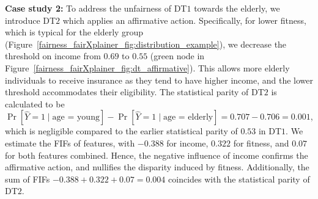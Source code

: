 \begin{example}
	
	
	\textbf{Case study 2:} 	
	To address the unfairness of DT$ 1 $ towards the elderly, we introduce DT$ 2 $ which applies an affirmative action. Specifically, for lower fitness, which is typical for the elderly group (Figure~\ref{fairness_fairXplainer_fig:distribution_example}), we decrease the threshold on income from $ 0.69 $ to $ 0.55 $ ({\color{affirmative}green} node in Figure~\ref{fairness_fairXplainer_fig:dt_affirmative}). This allows more elderly individuals to receive insurance as they tend to have higher income, and the lower threshold accommodates their eligibility. The statistical parity of DT$ 2 $ is calculated to be $ \Pr[\widehat{Y} = 1 \mid \text{age = young}] - \Pr[\widehat{Y} = 1 \mid \text{age = elderly}] = 0.707 - 0.706 = 0.001 $, which is negligible compared to the earlier statistical parity of $ 0.53 $ in DT$ 1 $. We estimate the FIFs of features, with $ - 0.388 $ for income, $ 0.322 $ for fitness, and $ 0.07 $ for both features combined. Hence, the negative influence of income confirms the affirmative action, and nullifies the disparity induced by fitness. Additionally, the sum of FIFs $ - 0.388 + 0.322 + 0.07 = 0.004 $ coincides with the statistical parity of DT$ 2 $. 
	

\end{example}
